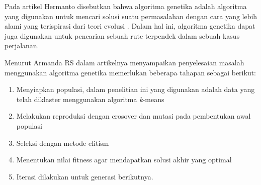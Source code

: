 Pada artikel Hermanto disebutkan bahwa algoritma genetika adalah algoritma yang digunakan untuk mencari solusi suatu permasalahan dengan cara yang lebih alami yang terispirasi dari teori evolusi  \cite{hermawanto2003algoritma}. Dalam hal ini, algoritma genetika dapat juga digunakan untuk pencarian sebuah rute terpendek dalam sebuah kasus perjalanan.

Menurut Armanda RS \cite{armanda2016penerapan} dalam artikelnya menyampaikan penyelesaian masalah menggunakan algoritma genetika memerlukan beberapa tahapan sebagai berikut:

\begin{enumerate}
	\item Menyiapkan populasi, dalam penelitian ini yang digunakan adalah data yang telah diklaster menggunakan algoritma \textit{k}-means
	\item Melakukan reproduksi dengan crosover dan mutasi pada pembentukan awal populasi
	\item Seleksi dengan metode elitism
	\item Menentukan nilai fitness agar mendapatkan solusi akhir yang optimal
	\item Iterasi dilakukan untuk generasi berikutnya.
\end{enumerate}